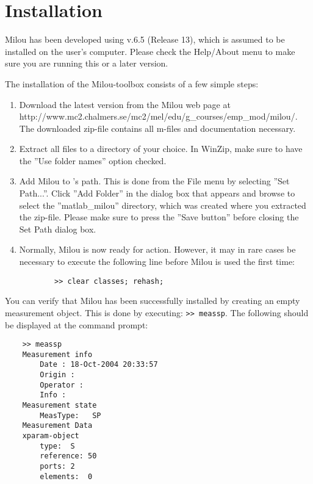 %
\section{Installation}%
Milou has been developed using \matlab v.6.5 (Release 13), which
is assumed to be installed on the user's computer. Please check
the Help/About menu to make sure you are running this or a later
version.

The installation of the Milou-toolbox consists of a few simple
steps:
\begin{enumerate}
    \item Download the latest version from the Milou web page at \newline http://www.mc2.chalmers.se/mc2/mel/edu/g\_courses/emp\_mod/milou/.
    \newline The downloaded zip-file contains all \matlab m-files and
documentation necessary.
    \item Extract all files to a directory of your choice. In WinZip, make
    sure to have the ''Use folder names'' option checked.
    \item Add Milou to \matlab's path. This is done from the
    File menu by selecting ''Set Path...''. Click ''Add Folder''
    in the dialog box that appears and browse to select the ''matlab\_milou''
    directory, which was created where you extracted the
    zip-file. Please make sure to press the ''Save button''
    before closing the Set Path dialog box.
    \item Normally, Milou is now ready for action. However, it
    may in rare cases be necessary to execute the following line before
    Milou is used the first time:
    \begin{verbatim}
        >> clear classes; rehash;
    \end{verbatim}
\end{enumerate}
You can verify that Milou has been successfully installed by
creating an empty measurement object. This is done by executing:
\verb">> meassp". The following should be displayed at the command
prompt:
\begin{verbatim}
    >> meassp
    Measurement info
        Date : 18-Oct-2004 20:33:57
        Origin :
        Operator :
        Info :
    Measurement state
        MeasType:   SP
    Measurement Data
    xparam-object
        type:  S
        reference: 50
        ports: 2
        elements:  0
\end{verbatim}

